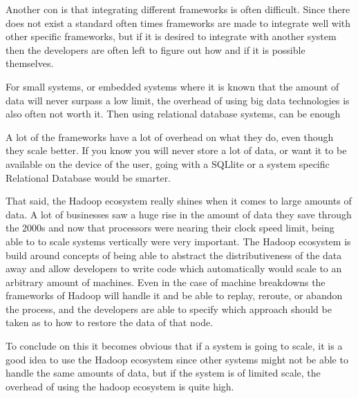 \newpar Another con is that integrating different frameworks is often difficult. Since there does not exist a standard often times frameworks are made to integrate well with other specific frameworks, but if it is desired to integrate with another system then the developers are often left to figure out how and if it is possible themselves.

For small systems, or embedded systems where it is known that the amount of data will never surpass a low limit, the overhead of using big data technologies is also often not worth it. Then using relational database systems, can be enough 

A lot of the frameworks have a lot of overhead on what they do, even though they scale better. If you know you will never store a lot of data, or want it to be available on the device of the user, going with a SQLlite or a system specific Relational Database would be smarter.

\newpar That said, the Hadoop ecosystem really shines when it comes to large amounts of data. A lot of businesses saw a huge rise in the amount of data they save through the 2000s and now that processors were nearing their clock speed limit, being able to to scale systems vertically were very important. The Hadoop ecosystem is build around concepts of being able to abstract the distributiveness of the data away and allow developers to write code which automatically would scale to an arbitrary amount of machines. Even in the case of machine breakdowns the frameworks of Hadoop will handle it and be able to replay, reroute, or abandon the process, and the developers are able to specify which approach should be taken as to how to restore the data of that node.

\newpar To conclude on this it becomes obvious that if a system is going to scale, it is a good idea to use the Hadoop ecosystem since other systems might not be able to handle the same amounts of data, but if the system is of limited scale, the overhead of using the hadoop ecosystem is quite high.
